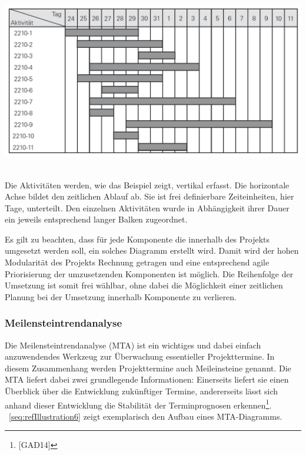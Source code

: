 \documentclass[a4paper]{article}
\makeatletter
\newcommand\captionof[1]{\def\@captype{#1}\caption}
\makeatother
\begin{document}
{\centering \includegraphics[width=15.323cm,height=7.856cm]{INMAusarbeitung02-img006.png}
\captionof{figure}[Beispiel eines Gantt{}-Diagramms]{Beispiel eines Gantt-Diagramms}
\label{seq:refIllustration5}
\par}
{\sffamily
Die Aktivitäten werden, wie das Beispiel zeigt, vertikal erfasst. Die horizontale Achse bildet den zeitlichen Ablauf ab.
Sie ist frei definierbare Zeiteinheiten, hier Tage, unterteilt. Den einzelnen Aktivitäten wurde in Abhängigkeit ihrer
Dauer ein jeweils entsprechend langer Balken zugeordnet. }


\bigskip

{\sffamily
Es gilt zu beachten, dass für jede Komponente die innerhalb des Projekts umgesetzt werden soll, ein solches Diagramm
erstellt wird. Damit wird der hohen Modularität des Projekts Rechnung getragen und eine entsprechend agile
Priorisierung der umzusetzenden Komponenten ist möglich. Die Reihenfolge der Umsetzung ist somit frei wählbar, ohne
dabei die Möglichkeit einer zeitlichen Planung bei der Umsetzung innerhalb Komponente zu verlieren.}

\subsubsection[Meilensteintrendanalyse]{\color{black} Meilensteintrendanalyse}
{\sffamily
Die Meilensteintrendanalyse (MTA) ist ein wichtiges und dabei einfach anzuwendendes Werkzeug zur Überwachung
essentieller Projekttermine. In diesem Zusammenhang werden Projekttermine auch Meileinsteine genannt. Die MTA liefert
dabei zwei grundlegende Informationen: Einerseits liefert sie einen Überblick über die Entwicklung zukünftiger Termine,
andererseits lässt sich anhand dieser Entwicklung die Stabilität der Terminprognosen erkennen\footnote{[GAD14]}.
\figurename~\ref{seq:refIllustration6} zeigt exemplarisch den Aufbau eines MTA-Diagramms.}
\end{document}
